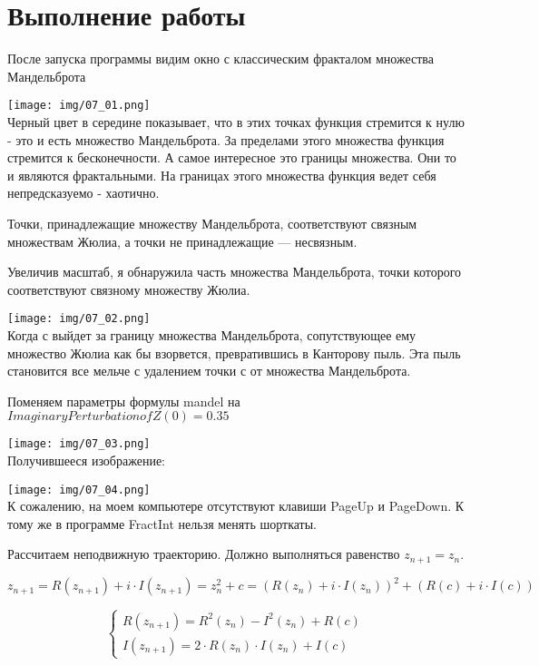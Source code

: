 \section{Выполнение работы}

После запуска программы видим окно с классическим фракталом множества Мандельброта

\texttt{[image: img/07\_01.png]}\\

Черный цвет в середине показывает, что в этих точках функция стремится к нулю - это и есть множество Мандельброта. За пределами этого множества функция стремится к бесконечности. А самое интересное это границы множества. Они то и являются фрактальными. На границах этого множества функция ведет себя непредсказуемо - хаотично.

Точки, принадлежащие множеству Мандельброта, соответствуют связным множествам Жюлиа, а точки не принадлежащие — несвязным.

Увеличив масштаб, я обнаружила часть множества Мандельброта, точки которого соответствуют связному множеству Жюлиа.

\texttt{[image: img/07\_02.png]}\\

Когда $с$ выйдет за границу множества Мандельброта, сопутствующее ему множество Жюлиа как бы взорвется, превратившись в Канторову пыль. Эта пыль становится все мельче с удалением точки $с$ от множества Мандельброта.


Поменяем параметры формулы mandel на $Imaginary Perturbation of Z(0) = 0.35$

\texttt{[image: img/07\_03.png]}\\

Получившееся изображение:

\texttt{[image: img/07\_04.png]}\\

К сожалению, на моем компьютере отсутствуют клавиши PageUp и PageDown. К тому же в программе FractInt нельзя менять шорткаты.

Рассчитаем неподвижную траекторию. Должно выполняться равенство $z_{n + 1} = z_{n}$.

$$ z_{n + 1} = R(z_{n + 1}) + i \cdot I(z_{n + 1}) = z_{n}^{2} + c = (R(z_{n}) + i \cdot I(z_{n}))^{2} + (R(c) + i \cdot I(c))$$


\begin{equation*}
 \begin{cases}
   R(z_{n + 1}) = R^{2}(z_{n}) - I^{2}(z_{n}) + R(c)
   \\
   I(z_{n + 1}) = 2 \cdot R(z_{n}) \cdot I(z_{n}) + I(c)
 \end{cases}
\end{equation*}


